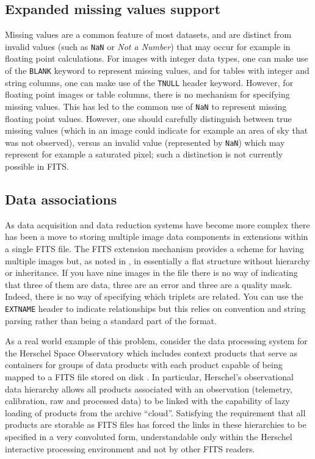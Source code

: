 \documentclass[final,authoryear,5p,times,twocolumn]{elsarticle}
\begin{document}
{{\subsection{Expanded missing values support}

Missing values are a common feature of most datasets, and are distinct from
invalid values (such as \texttt{NaN} or \textit{Not a Number}) that may occur
for example in floating point calculations. For images with integer data
types, one can make use of the \texttt{BLANK} keyword to represent missing
values, and for tables with integer and string columns, one can make use of
the \texttt{TNULL} header keyword. However, for floating point images or
table columns, there is no mechanism for specifying missing values. This has
led to the common use of \texttt{NaN} to represent missing floating point
values. However, one should carefully distinguish between true missing values
(which in an image could indicate for example an area of sky that was not
observed), versus an invalid value (represented by \texttt{NaN}) which may
represent for example a saturated pixel; such a distinction is not currently possible
in FITS.


\subsection{Data associations}
\label{section_data_associations}


As data acquisition and data reduction systems have become more
complex there has been a move to storing multiple image data
components in extensions within a single FITS file. The FITS extension
mechanism provides a scheme for having multiple images but, as noted
in \citet{2003ASSL..285...71G}, in essentially a flat structure
without hierarchy or inheritance. If you have nine images in the file
there is no way of indicating that three of them are data, three are an error
and three are a quality mask. Indeed, there is no way of specifying which
triplets are related. You can use the \texttt{EXTNAME} header to
indicate relationships but this relies on convention and string
parsing rather than being a standard part of the format.


As a real world example of this problem, consider the data processing
system for the Herschel Space Observatory which includes
context products that serve as containers for groups of data products
with each product capable of being mapped to a
FITS file stored on disk
\citep[see the Herschel architecture and design document;][]{2008HerschelDesign}.
In particular, Herschel's observational data
hierarchy allows all products associated with an observation (telemetry,
calibration, raw and processed data) to be linked with the capability of
lazy loading of products from the archive ``cloud''.
Satisfying the requirement that all products are storable as FITS files
has forced the links in these hierarchies to be specified in a very
convoluted form, understandable only within the
Herschel interactive processing environment
\citep[HIPE;][]{2010ASPC..434..139O} and not by other FITS readers.


}}
\end{document}
